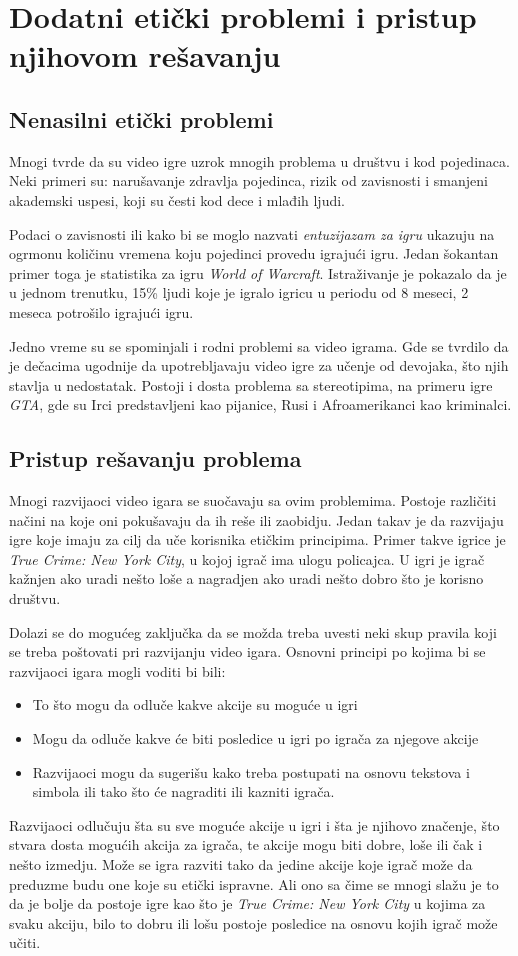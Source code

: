 \documentclass[a4paper]{article}
\begin{document}
\newpage
\section{Dodatni etički problemi i pristup njihovom rešavanju}
\label{sec:etika}
\subsection{Nenasilni etički problemi}
Mnogi tvrde da su video igre uzrok mnogih problema u društvu i kod pojedinaca. Neki primeri su: narušavanje zdravlja pojedinca,
rizik od zavisnosti i smanjeni akademski uspesi, koji su česti kod dece i mlađih ljudi.

Podaci o zavisnosti ili kako bi se moglo nazvati {\em entuzijazam za igru} ukazuju na ogrmonu količinu vremena koju pojedinci
provedu igrajući igru. Jedan šokantan primer toga je statistika za igru {\em World of Warcraft}. Istraživanje je
pokazalo da je u jednom trenutku, 15\% ljudi koje je igralo igricu u periodu od 8 meseci, 2 meseca 
potrošilo igrajući igru.

Jedno vreme su se spominjali i rodni problemi sa video igrama. Gde se tvrdilo da je dečacima
ugodnije da upotrebljavaju video igre za učenje od devojaka, što njih stavlja u nedostatak. 
Postoji i dosta problema sa stereotipima, na primeru igre {\em GTA}, gde su Irci predstavljeni kao pijanice, 
Rusi i Afroamerikanci kao kriminalci.

\subsection{Pristup rešavanju problema}
Mnogi razvijaoci video igara se suočavaju sa ovim problemima. Postoje različiti načini na koje oni pokušavaju da
ih reše ili zaobidju. Jedan takav je da razvijaju igre koje imaju za cilj da uče korisnika etičkim principima.
Primer takve igrice je {\em True Crime: New York City}, u kojoj igrač ima ulogu policajca. U igri je igrač kažnjen
ako uradi nešto loše a nagradjen ako uradi nešto dobro što je korisno društvu.

Dolazi se do mogućeg zaključka da se možda treba uvesti neki skup pravila koji se treba poštovati pri razvijanju
video igara. Osnovni principi po kojima bi se razvijaoci igara mogli voditi bi bili:
\begin{itemize}
\item To što mogu da odluče kakve akcije su moguće u igri
\item Mogu da odluče kakve će biti posledice u igri po igrača za njegove akcije
\item Razvijaoci mogu da sugerišu kako treba postupati na osnovu tekstova i simbola ili tako 
što će nagraditi ili kazniti igrača.
\end{itemize}  
Razvijaoci odlučuju šta su sve moguće akcije u igri i šta je njihovo značenje, što stvara dosta mogućih akcija za igrača,
te akcije mogu biti dobre, loše ili čak i nešto izmedju. Može se igra razviti tako da jedine akcije koje igrač može
da preduzme budu one koje su etički ispravne. Ali ono sa čime se mnogi slažu je to da je bolje da postoje igre kao
što je {\em True Crime: New York City} u kojima za svaku akciju, bilo to dobru ili lošu postoje posledice na osnovu 
kojih igrač može učiti.
\end{document}
